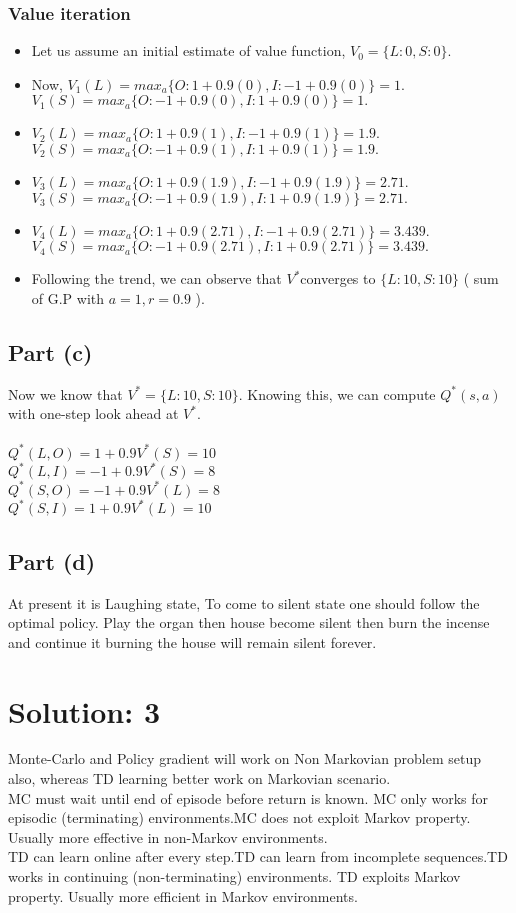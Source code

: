 \documentclass{article}
\begin{document}
\subsubsection{Value iteration}
\begin{itemize}
\item Let us assume an initial estimate of value function, $V_{0}=\{L:0,S:0\}.$
\item Now, $V_{1}(L)=max_{a}\{O:1+0.9(0),I:-1+0.9(0)\}=1$.\\
$V_{1}(S)=max_{a}\{O:-1+0.9(0),I:1+0.9(0)\}=1.$
\item $V_{2}(L)=max_{a}\{O:1+0.9(1),I:-1+0.9(1)\}=1.9$.\\
$V_{2}(S)=max_{a}\{O:-1+0.9(1),I:1+0.9(1)\}=1.9.$
\item $V_{3}(L)=max_{a}\{O:1+0.9(1.9),I:-1+0.9(1.9)\}=2.71$.\\
$V_{3}(S)=max_{a}\{O:-1+0.9(1.9),I:1+0.9(1.9)\}=2.71.$
\item $V_{4}(L)=max_{a}\{O:1+0.9(2.71),I:-1+0.9(2.71)\}=3.439$.\\
$V_{4}(S)=max_{a}\{O:-1+0.9(2.71),I:1+0.9(2.71)\}=3.439.$
\item Following the trend, we can observe that $V^{*}$converges to $\{L:10,S:10\}$
( sum of G.P with $a=1,r=0.9$ ).
\end{itemize}

\subsection{Part (c)}

Now we know that $V^{*}=\{L:10,S:10\}$. Knowing this, we can compute
$Q^{*}(s,a)$ with one-step look ahead at $V^{*}$.\\
\\
$Q^{*}(L,O)=1+0.9V^{*}(S)=10$\\
$Q^{*}(L,I)=-1+0.9V^{*}(S)=8$\\
$Q^{*}(S,O)=-1+0.9V^{*}(L)=8$\\
$Q^{*}(S,I)=1+0.9V^{*}(L)=10$

\subsection{Part (d)}
At present it is Laughing state, To come to silent state one should follow the optimal policy. Play the organ then house become silent then burn the incense and continue it burning the house will remain silent forever.

\section{Solution: 3} 
Monte-Carlo and Policy gradient will work on Non Markovian problem setup also, whereas TD learning better work on Markovian scenario.
\\MC must wait until end of episode before return is known. MC only works for episodic (terminating) environments.MC does not exploit Markov property. Usually more effective in non-Markov environments.
\\TD can learn online after every step.TD can learn from incomplete sequences.TD works in continuing (non-terminating) environments. TD exploits Markov property. Usually more efficient in Markov environments.
\end{document}
